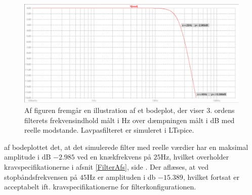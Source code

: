 \begin{figure}[H]
	\centering
	\includegraphics[scale=0.4]{figures/cProblemloesning/Sim_reel_graf.PNG}
	\caption{Af figuren fremgår en illustration af et bodeplot, der viser 3. ordens filterets frekvensindhold målt i Hz over dæmpningen målt i dB med reelle modstande. Lavpasfilteret er simuleret i LTspice.}
	\label{fig:Sim_reel_graf}
\end{figure}

\noindent af bodeplottet det, at det simulerede filter med reelle værdier har en maksimal amplitude i dB $-2.985$ ved en knækfrekvens på $25$Hz, hvilket overholder kravspecifikationerne i afsnit \ref{FilterAfs}, side \pageref{FilterAfs}. Der aflæses, at ved stopbåndsfrekvensen på $45$Hz er amplituden i db $-15.389$, hvilket fortsat er acceptabelt ift. kravspecifikationerne for filterkonfigurationen. 

